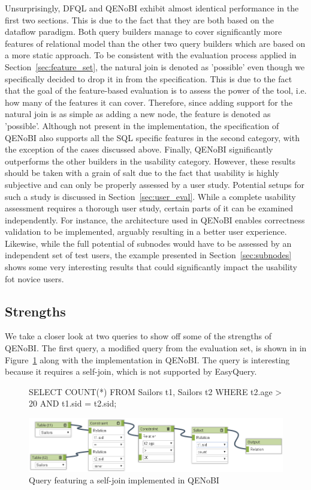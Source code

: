 \documentclass[11pt,a4paper]{globis-book}
\begin{document}
Unsurprisingly, DFQL and QENoBI exhibit almost identical performance in the first two sections. This is due to the fact that they are both based on the dataflow paradigm. Both query builders manage to cover significantly more features of relational model than the other two query builders which are based on a more static approach. To be consistent with the evaluation process applied in Section~\ref{sec:feature_set}, the natural join is denoted as 'possible' even though we specifically decided to drop it in from the specification. This is due to the fact that the goal of the feature-based evaluation is to assess the power of the tool, i.e. how many of the features it can cover. Therefore, since adding support for the natural join is as simple as adding a new node, the feature is denoted as 'possible'. Although not present in the implementation, the specification of QENoBI also supports all the SQL specific features in the second category, with the exception of the cases discussed above. Finally, QENoBI significantly outperforms the other builders in the usability category. However, these results should be taken with a grain of salt due to the fact that usability is highly subjective and can only be properly assessed by a user study. Potential setups for such a study is discussed in Section~\ref{sec:user_eval}. While a complete usability assessment requires a thorough user study, certain parts of it can be examined independently. For instance, the architecture used in QENoBI enables correctness validation to be implemented, arguably resulting in a better user experience. Likewise, while the full potential of subnodes would have to be assessed by an independent set of test users, the example presented in Section~\ref{sec:subnodes} shows some very interesting results that could significantly impact the usability fot novice users.

\subsection{Strengths}

We take a closer look at two queries to show off some of the strengths of QENoBI. The first query, a modified query from the evaluation set, is shown in in Figure~\ref{fig:eval_query1} along with the implementation in QENoBI. The query is interesting because it requires a self-join, which is not supported by EasyQuery.

\begin{figure}[h]
\begin{codeex}[]
SELECT
  COUNT(*)
FROM
  Sailors t1, Sailors t2
WHERE
  t2.age > 20 AND t1.sid = t2.sid;
\end{codeex}

  \centering
  \includegraphics[width=\textwidth]{resources/EvalQuery1.png}
  \caption{Query featuring a self-join implemented in QENoBI}
  \label{fig:eval_query1}
\end{figure}
\end{document}
